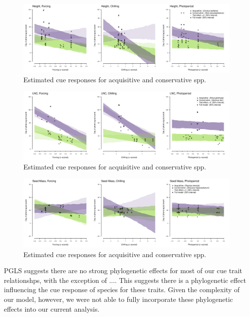 \documentclass{article}\usepackage[]{graphicx}\usepackage[]{color}
\begin{document}
\begin{figure}[h!]
    \centering
 \includegraphics[width=\textwidth]{..//..//analyses/traits/figures/results_height_37spp_ac.pdf} 
    \caption{Estimated cue responses for acquisitive and conservative spp.}
    \label{height}
\end{figure}

\begin{figure}[h!]
    \centering
 \includegraphics[width=\textwidth]{..//..//analyses/traits/figures/results_lnc_37spp_ac.pdf} 
    \caption{Estimated cue responses for acquisitive and conservative spp.}
    \label{lnc}
\end{figure}

\begin{figure}[h!]
    \centering
 \includegraphics[width=\textwidth]{..//..//analyses/traits/figures/results_seedmass_37spp_ac.pdf} 
    \caption{Estimated cue responses for acquisitive and conservative spp.}
    \label{seedmass}
\end{figure}
PGLS suggests there are no strong phylogenetic effects for most of our cue trait relationshps, with the exception of .... This suggests there is a phylogenetic effect influencing the cue response of species for these traits. Given the complexity of our model, however, we were not able to fully incorporate these phylogenetic effects into our current analysis. 
\end{document}
